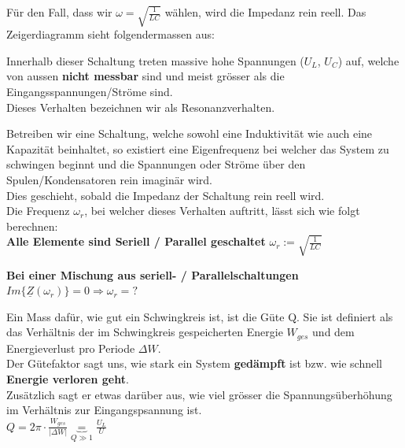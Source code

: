 Für den Fall, dass wir $\omega = \sqrt{\frac{1}{LC}}$ wählen, wird die Impedanz rein reell. Das Zeigerdiagramm sieht folgendermassen aus: \\
\begin{center}
\end{center}
Innerhalb dieser Schaltung treten massive hohe Spannungen ($U_L$, $U_C$) auf, welche von aussen \textbf{nicht messbar} sind und meist grösser als die Eingangsspannungen/Ströme sind.  \\
Dieses Verhalten bezeichnen wir als Resonanzverhalten.

\beginip
Betreiben wir eine Schaltung, welche sowohl eine Induktivität wie auch eine Kapazität beinhaltet, so existiert eine Eigenfrequenz bei welcher das System zu schwingen beginnt und die Spannungen oder Ströme über den Spulen/Kondensatoren rein imaginär wird. \\
Dies geschieht, sobald die Impedanz der Schaltung rein reell wird. \\
Die Frequenz $\omega_r$, bei welcher dieses Verhalten auftritt, lässt sich wie folgt berechnen:\\
\textbf{Alle Elemente sind Seriell / Parallel geschaltet}
\formulaBegin
$\displaystyle \omega_r := \sqrt{\frac{1}{LC}}$
\formulaEnd

\textbf{Bei einer Mischung aus seriell- / Parallelschaltungen}
\formulaBegin
$\displaystyle Im\{\underline{Z}(\omega_r)\}= 0 \Rightarrow \omega_r = ?$
\formulaEnd
\iend


\beginip

Ein Mass dafür, wie gut ein Schwingkreis ist, ist die Güte Q. Sie ist definiert als das Verhältnis der im Schwingkreis gespeicherten Energie $W_{ges}$ und dem Energieverlust pro Periode $\Delta W$. \\
Der Gütefaktor sagt uns, wie stark ein System \textbf{gedämpft} ist bzw. wie schnell \textbf{Energie verloren geht}.\\
Zusätzlich sagt er etwas darüber aus, wie viel grösser die Spannungsüberhöhung im Verhältnis zur Eingangspsannung ist. \\
\formulaBegin
$\displaystyle Q = 2 \pi \cdot \frac{W_{ges}}{|\Delta W|} \underbrace{=}_{Q \gg 1} \frac{U_L}{U}$
\formulaEnd
\iend
